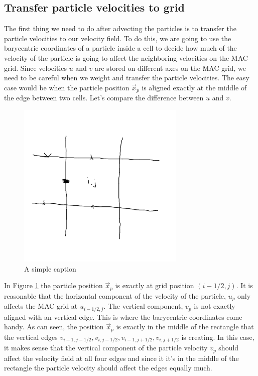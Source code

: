 \subsection{Transfer particle velocities to grid}

The first thing we need to do after advecting the particles is to transfer the particle velocities to our velocity field. To do this, we are going to use the barycentric coordinates of a particle inside a cell to decide how much of the velocity of the particle is going to affect the neighboring velocities on the MAC grid. Since velocities $u$ and $v$ are stored on different axes on the MAC grid, we need to be careful when we weight and transfer the particle velocities. The easy case would be when the particle position $\vec{x}_p$ is aligned exactly at the middle of the edge between two cells. Let's compare the difference between $u$ and $v$. 

\begin{figure}[ht!]
\centering
\includegraphics[width=80mm]{ch3/onedge.png}
\caption{A simple caption}
\label{onedge}
\end{figure}

In Figure \ref{onedge} the particle position $\vec{x}_p$ is exactly at grid position $(i-1/2,j)$. It is reasonable that the horizontal component of the velocity of the particle, $u_p$ only affects the MAC grid at $u_{i-1/2,j}$. The vertical component, $v_p$ is not exactly aligned with an vertical edge. This is where the barycentric coordinates come handy. As can seen, the position $\vec{x}_p$ is exactly in the middle of the rectangle that the vertical edges $v_{i-1,j-1/2}, v_{i,j-1/2}, v_{i-1,j+1/2}, v_{i,j+1/2} $ is creating. In this case, it makes sense that the vertical component of the particle velocity $v_p$ should affect the velocity field at all four edges and since it it's in the middle of the rectangle the particle velocity should affect the edges equally much.

